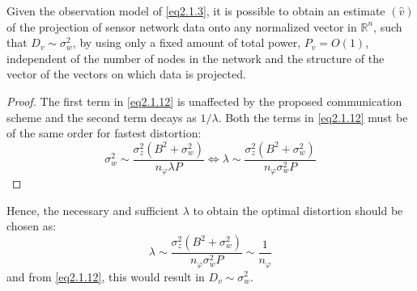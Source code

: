 \begin{theorem}
    \label{th2.1.1}
    Given the observation model of \cref{eq2.1.3}, it is possible to obtain an estimate $(\hat{v})$ of the projection of sensor network data onto any normalized vector in $\mathbb{R}^n$, such that $D_v \sim \sigma_w^2$, by using only a fixed amount of total power, $P_v = O(1)$, independent of the number of nodes in the network and the structure of the vector of the vectors on which data is projected.
\end{theorem}

\begin{proof}
    The first term in \cref{eq2.1.12} is unaffected by the proposed communication scheme and the second term decays as $1/\lambda$. Both the terms in \cref{eq2.1.12} must be of the same order for fastest distortion:
    \begin{equation}
        \sigma_w^2 \sim \dfrac{\sigma_z^2(B^2+\sigma_w^2)}{n_{\varphi}\lambda P} \Longleftrightarrow \lambda \sim \dfrac{\sigma_z^2(B^2+\sigma_w^2)}{n_{\varphi} \sigma_w^2 P}
        \label{eq2.1.13}
    \end{equation}
\end{proof}
Hence, the necessary and sufficient $\lambda$ to obtain the optimal distortion should be chosen as:
\begin{equation}
    \lambda \sim \dfrac{\sigma_z^2(B^2+\sigma_w^2)}{n_{\varphi}\sigma_w^2 P} \sim \dfrac{1}{n_{\varphi}}
    \label{eq2.1.14}
\end{equation}
and from \cref{eq2.1.12}, this would result in $D_v \sim \sigma_w^2$. 
